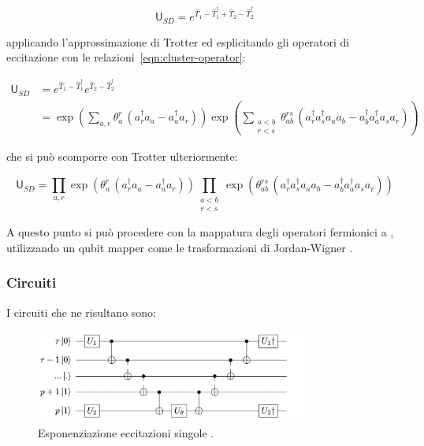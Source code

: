 \begin{equation}\label{eqn:UCCSD}
    \mathsf{U}_{SD} = 
    e^{\hat{T}_1 - \hat{T}^{\dagger}_{1} + \hat{T}_2 - \hat{T}^{\dagger}_{2}}
\end{equation}

applicando l'approssimazione di Trotter ed esplicitando gli operatori di eccitazione con le relazioni~\ref{eqn:cluster-operator}:

\begin{equation}
\begin{aligned}
    \mathsf{U}_{SD}
    &= e^{\hat{T}_1 - \hat{T}^{\dagger}_{1}} e^{\hat{T}_2 - \hat{T}^{\dagger}_{2}}\\
    &= 
    \exp\left(
        {\sum_{a,r} \theta_{a}^{r}\,( a^{\dagger}_r a_a - a^{\dagger}_a a_r )}
        \right)
    \exp\left(
        \sum_{\substack{a<b\\r<s}} \theta_{ab}^{rs}\, 
        (a^{\dagger}_r a^{\dagger}_{s} a_a a_b - a^{\dagger}_b a^{\dagger}_{a} a_s a_r)
        \right)
\end{aligned}
\end{equation}

che si può scomporre con Trotter ulteriormente:

\begin{equation}
    \mathsf{U}_{SD} = 
    \prod_{a,r} \exp\left({\theta_{a}^{r}\,( a^{\dagger}_r a_a - a^{\dagger}_a a_r )}\right)
    \prod_{\substack{a<b\\r<s}} 
    \exp\left({\theta_{ab}^{rs}\,(a^{\dagger}_r a^{\dagger}_{s} a_a a_b - a^{\dagger}_b a^{\dagger}_{a} a_s a_r)}\right)
\end{equation}


A questo punto si può procedere con la mappatura degli operatori fermionici a , utilizzando un qubit mapper come le trasformazioni di Jordan-Wigner \cite{Barkoutsos_2018}.

\subsubsection{Circuiti}
I circuiti che ne risultano sono:

\begin{figure}[H]
    \centering
    \includegraphics[width=0.8\textwidth]{Immagini/Capitolo_2/ucc_singles.png}
    \caption{Esponenziazione eccitazioni singole \cite{Carobene_2021}.}
    \label{fig:eccitazioni-singole}
\end{figure} 

